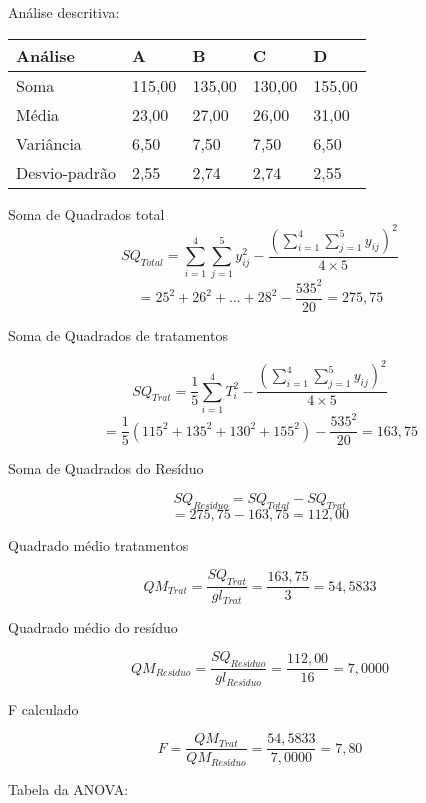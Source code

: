 \documentclass[
]{book}
\begin{document}
Análise descritiva:

\begin{longtable}[]{@{}lllll@{}}
\toprule()
Análise & A & B & C & D \\
\midrule()
\endhead
Soma & 115,00 & 135,00 & 130,00 & 155,00 \\
Média & 23,00 & 27,00 & 26,00 & 31,00 \\
Variância & 6,50 & 7,50 & 7,50 & 6,50 \\
Desvio-padrão & 2,55 & 2,74 & 2,74 & 2,55 \\
\bottomrule()
\end{longtable}

Soma de Quadrados total
\[SQ_{Total} = \displaystyle{\sum_{i=1}^4\sum_{j=1}^5y_{ij}^2 - \frac{\left(\sum_{i=1}^4\sum_{j=1}^5y_{ij}\right)^2}{4\times5}}\]
\[ = \displaystyle{25^2 + 26^2 + \ldots + 28^2 - \frac{535^2}{20}} 
 = 275,75\]

Soma de Quadrados de tratamentos

\[SQ_{Trat} = \displaystyle{\frac{1}{5}\sum_{i=1}^4 T_i^2 - \frac{\left(\sum_{i=1}^4\sum_{j=1}^5y_{ij}\right)^2}{4\times5}}\]
\[= \displaystyle{\frac{1}{5}\left(115^2 + 135^2 + 130^2 + 155^2\right) - \frac{535^2}{20}}= 163,75\]

Soma de Quadrados do Resíduo

\[SQ_{Resíduo} = SQ_{Total} - SQ_{Trat}\]
\[= 275,75 - 163,75 = 112,00\]

Quadrado médio tratamentos

\[QM_{Trat} = \displaystyle{\frac{SQ_{Trat}}{gl_{Trat}}}
= \displaystyle{\frac{163,75}{3}} = 54,5833\]

Quadrado médio do resíduo

\[QM_{Resíduo} = \displaystyle{\frac{SQ_{Resíduo}}{gl_{Resíduo}}}=\displaystyle{\frac{112,00}{16}}= 7,0000\]

F calculado

\[F = \displaystyle{\frac{QM_{Trat}}{QM_{Resíduo}}}=\displaystyle{\frac{54,5833}{7,0000}}= 7,80\]

Tabela da ANOVA:
\end{document}
